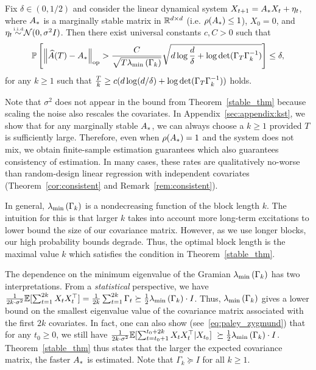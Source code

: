 \begin{thm}\label{stable_thm} Fix $\delta \in (0,1/2)$ and consider the linear dynamical system $X_{t+1} = A_{*} X_t + \eta_t $, where $A_{*}$ is a marginally stable matrix in $\mathbb{R}^{d\times d}$ (i.e. $\rho(A_{*}) \leq 1$), $X_0 = 0$, and $\noise_t  \iid \calN(0,\sigma^2 I)$. Then there exist universal constants $c,C > 0$ such that
\begin{align}
\mathbb{P}\left[\left\lVert \widehat{A}(T)-A_{*} \right\rVert_{\mathrm{op}} >\frac{C}{\sqrt{T\lambda_{\min}\left(\Gamma_{k}\right)}} \sqrt{d\log\frac{d}{\delta} + \log \det (\Gamma_T \Gamma_k^{-1})} \right] \le  \delta,
\end{align}
for any $k \ge 1$ such that $\frac{T}{k} \ge c(d\log(d/\delta)+\log \det (\Gamma_T \Gamma_{k}^{-1}))$ holds.
\end{thm}
Note that $\sigma^2$ does not appear in the bound from Theorem~\ref{stable_thm} because scaling the noise also rescales the covariates. In Appendix~\ref{sec:appendix:kst}, we show that for any marginally stable $A_{*}$,
we can always choose a $k \geq 1$ provided $T$ is sufficiently large. Therefore, even when $\rho(A_{*}) = 1$ and the system does not mix, we obtain finite-sample estimation guarantees which also guarantees consistency of estimation. In many cases, these rates are qualitatively no-worse than random-design linear regression with independent covariates (Theorem~\ref{cor:consistent} and Remark~\ref{rem:consistent}).

In general, $\lambda_{\min}\left(\Gamma_k\right)$ is a nondecreasing function of the block length $k$. The intuition for this is that larger $k$ takes into account more long-term excitations to lower bound the size of our covariance matrix. However, as we use longer blocks, our high probability bounds degrade. Thus, the optimal block length is the maximal value $k$ which satisfies the condition in Theorem~\ref{stable_thm}.

The dependence on the minimum eigenvalue of the Gramian $\lambda_{\min}\left(\Gamma_k\right)$ has two interpretations. From a \emph{statistical} perspective, we have $\frac{1}{2k\cdot \sigma^2}\mathbb{E}[\sum_{t=1}^{2k} X_tX_t^\top] = \frac{1}{2k}\sum_{t= 1}^{2k}\Gamma_t \succeq \frac{1}{2}\lambda_{\min}\left(\Gamma_k\right) \cdot I $. Thus, $\lambda_{\min}\left(\Gamma_k\right)$ gives a lower bound on the smallest eigenvalue value of the covariance matrix associated with the first $2k$ covariates. In fact, one can also show (see~\eqref{eq:paley_zygmund}) that for any $t_0 \ge 0$, we still have $\frac{1}{2k\cdot \sigma^2}\mathbb{E}[\sum_{t=t_0 + 1}^{t_0 + 2k} X_tX_t^\top | X_{t_0}]~\succeq  \frac{1}{2}\lambda_{\min}\left(\Gamma_k\right) \cdot I$. Theorem~\ref{stable_thm} thus states that the larger the expected covariance matrix, the faster $A_{*}$ is estimated. Note that $\Gamma_k \succeq I$ for all $k \ge 1$.

